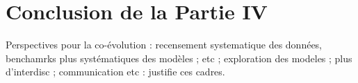 





\chapter*{Conclusion de la Partie IV}






Perspectives pour la co-évolution : recensement systematique des données, benchamrks plus systématiques des modèles ; etc ; exploration des modeles ; plus d'interdisc ; communication etc : justifie ces cadres.










